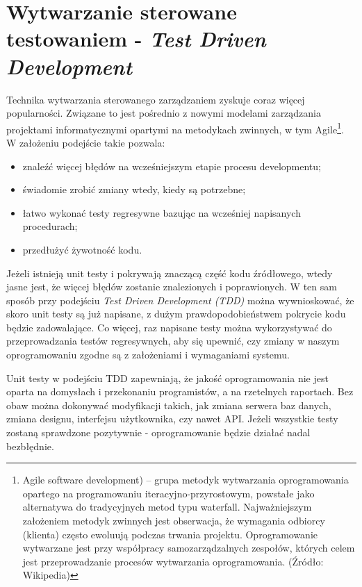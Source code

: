 \section{Wytwarzanie sterowane testowaniem - \textit{Test Driven Development}}
\label{test_driven_development}
Technika wytwarzania sterowanego zarządzaniem zyskuje coraz więcej popularności. Związane to jest pośrednio z nowymi modelami zarządzania projektami informatycznymi opartymi na metodykach zwinnych, w tym Agile\footnote{Agile software development) – grupa metodyk wytwarzania oprogramowania opartego na programowaniu iteracyjno-przyrostowym, powstałe jako alternatywa do tradycyjnych metod typu waterfall. Najważniejszym założeniem metodyk zwinnych jest obserwacja, że wymagania odbiorcy (klienta) często ewoluują podczas trwania projektu. Oprogramowanie wytwarzane jest przy współpracy samozarządzalnych zespołów, których celem jest przeprowadzanie procesów wytwarzania oprogramowania. (Źródło: Wikipedia) }. W założeniu podejście takie pozwala:

\begin{itemize}
\item znaleźć więcej błędów na wcześniejszym etapie procesu developmentu;
\item świadomie zrobić zmiany wtedy, kiedy są potrzebne;
\item łatwo wykonać testy regresywne bazując na wcześniej napisanych procedurach;
\item przedłużyć żywotność kodu.
\end{itemize}

Jeżeli istnieją unit testy i pokrywają znaczącą część kodu źródłowego, wtedy jasne jest, że więcej błędów zostanie znalezionych i poprawionych. W ten sam sposób przy podejściu \textit{Test Driven Development (TDD)} można wywnioskować, że skoro unit testy są już napisane, z dużym prawdopodobieństwem pokrycie kodu będzie zadowalające. Co więcej, raz napisane testy można wykorzystywać do przeprowadzania testów regresywnych, aby się upewnić, czy zmiany w naszym oprogramowaniu zgodne są z założeniami i wymaganiami systemu.

Unit testy w podejściu TDD zapewniają, że jakość oprogramowania nie jest oparta na domysłach i przekonaniu programistów, a na rzetelnych raportach. Bez obaw można dokonywać modyfikacji takich, jak zmiana serwera baz danych, zmiana designu, interfejsu użytkownika, czy nawet API. Jeżeli wszystkie testy zostaną sprawdzone pozytywnie - oprogramowanie będzie działać nadal bezbłędnie.


